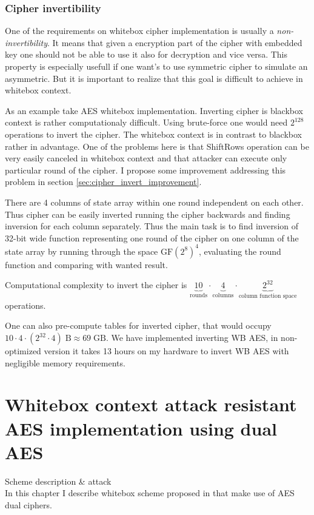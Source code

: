\documentclass[11pt,oneside,final]{fithesis2}
\begin{document}
    \subsection{Cipher invertibility}\label{sec:cipher_invertibility}
    One of the requirements on whitebox cipher implementation is usually a \emph{non-invertibility}. It means that given a encryption part of the cipher 
    with embedded key one should not be able to use it also for decryption and vice versa. This property is especially usefull if one want's to use symmetric
    cipher to simulate an asymmetric. But it is important to realize that this goal is difficult to achieve in whitebox context.
    
    As an example take AES whitebox implementation. Inverting cipher is blackbox context is rather computationaly difficult. Using brute-force one would
    need $2^{128}$ operations to invert the cipher. The whitebox context is in contrast to blackbox rather in advantage. One of the problems here is 
    that ShiftRows operation can be very easily canceled in whitebox context and that attacker can execute only particular round of the cipher. 
    I propose some improvement addressing this problem in section \ref{sec:cipher_invert_improvement}.

    There are 4 columns of state array within one round independent on each other.
    Thus cipher can be easily inverted running the cipher backwards and finding inversion for each column separately. Thus the main task is to find 
    inversion of 32-bit wide function representing one round of the cipher on one column of the state array by running through the space $\text{GF}\left(2^8\right)^4$,
    evaluating the round function and comparing with wanted result.
    
    Computational complexity to invert the cipher
    is $\underbrace{10}_\text{rounds} \cdot \underbrace{4}_\text{columns} \cdot \underbrace{2^{32}}_\text{column function space}$ operations.
    
    One can also pre-compute tables for inverted cipher, that would occupy $10 \cdot 4 \cdot (2^{32} \cdot 4)\;\text{B} \approx 69\;\text{GB}$.
    We have implemented inverting WB AES, in non-optimized version it takes 13 hours on my hardware to invert WB AES with negligible memory requirements.

\chapter{Whitebox context attack resistant AES implementation using dual AES}
    Scheme description \& attack\\
    In this chapter I describe whitebox scheme proposed in \citep{Karroumi:2010:PWA:2041036.2041060} that make use of AES dual ciphers.
    
\end{document}
